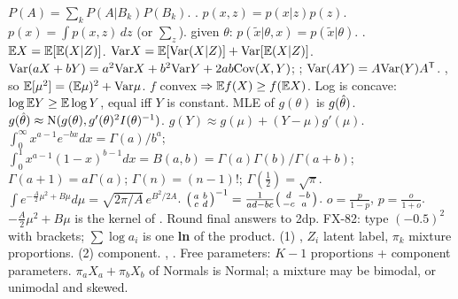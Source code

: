   $P(A)=\sum_k P(A|B_k)P(B_k)$.  .  $p(x,z)=p(x|z)p(z)$.  $p(x)=\int p(x,z)\,dz$ (or $\sum_z$).  given $\theta$: $p(\tilde x|\theta,x)=p(\tilde x|\theta)$.  .
\sk{} $\mathbb{E} X=\mathbb{E}[\mathbb{E}(X|Z)]$.  $\mathrm{Var} X=\mathbb{E}[\mathrm{Var}(X|Z)]+\mathrm{Var}[\mathbb{E}(X|Z)]$.  $\mathrm{Var}(aX+bY)=a^2\mathrm{Var} X+b^2\mathrm{Var} Y+2ab\mathrm{Cov}(X,Y)$; ; $\mathrm{Var}(AY)=A\mathrm{Var}(Y)A^{\mathsf T}$.
\sk{} , so $\mathbb{E}[\mu^2]=(\mathbb{E}\mu)^2+\mathrm{Var}\mu$.
\sk{} $f$ convex $\Rightarrow\mathbb{E} f(X)\ge f(\mathbb{E} X)$. Log is concave: $\log\mathbb{E} Y\ge\mathbb{E}\log Y$, equal iff $Y$ is constant.
\sk{} MLE of $g(\theta)$ is $g(\hat{\theta})$.  $g(\hat{\theta})\approx\mathrm{N}(g(\theta),g'(\theta)^2I(\theta)^{-1})$.  $g(Y)\approx g(\mu)+(Y-\mu)g'(\mu)$.
\sk{} $\int_0^\infty x^{a-1}e^{-bx}dx=\Gamma(a)/b^a$; $\int_0^1x^{a-1}(1-x)^{b-1}dx=B(a,b)=\Gamma(a)\Gamma(b)/\Gamma(a+b)$; $\Gamma(a+1)=a\Gamma(a)$; $\Gamma(n)=(n-1)!$; $\Gamma(\tfrac12)=\sqrt\pi$.  $\int e^{-\frac A2\mu^2+B\mu}d\mu=\sqrt{2\pi/A}\,e^{B^2/2A}$.
\sk{} $\begin{psmallmatrix}a&b\\c&d\end{psmallmatrix}^{-1}=\frac1{ad-bc}\begin{psmallmatrix}d&-b\\-c&a\end{psmallmatrix}$.  $o=\frac p{1-p}$, $p=\frac o{1+o}$.
\sk{} $-\frac A2\mu^2+B\mu$ is the kernel of .  Round final answers to 2dp. FX-82: type $(-0.5)^2$ with brackets; $\sum\log a_i$ is one \textbf{ln} of the product.
 (1) , $Z_i$ latent label, $\pi_k$ mixture proportions. (2)  component.
\sk{}, . Free parameters: $K-1$ proportions + component parameters.  $\pi_aX_a+\pi_bX_b$ of Normals is Normal; a mixture may be bimodal, or unimodal and skewed.
